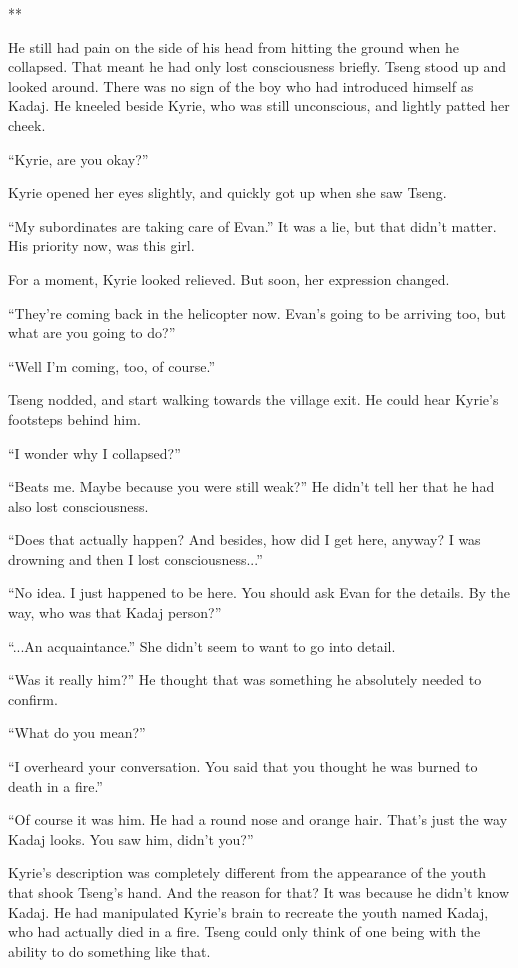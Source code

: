 \documentclass[oneside]{book}
\begin{document}
**

He still had pain on the side of his head from hitting the ground when he collapsed. That meant he had only lost consciousness briefly. Tseng stood up and looked around. There was no sign of the boy who had introduced himself as Kadaj. He kneeled beside Kyrie, who was still unconscious, and lightly patted her cheek.

“Kyrie, are you okay?”

Kyrie opened her eyes slightly, and quickly got up when she saw Tseng.

“My subordinates are taking care of Evan.” It was a lie, but that didn’t matter. His priority now, was this girl.

For a moment, Kyrie looked relieved. But soon, her expression changed.

“They’re coming back in the helicopter now. Evan’s going to be arriving too, but what are you going to do?”

“Well I’m coming, too, of course.”

Tseng nodded, and start walking towards the village exit. He could hear Kyrie’s footsteps behind him.

“I wonder why I collapsed?”

“Beats me. Maybe because you were still weak?” He didn’t tell her that he had also lost consciousness.

“Does that actually happen? And besides, how did I get here, anyway? I was drowning and then I lost consciousness...”

“No idea. I just happened to be here. You should ask Evan for the details. By the way, who was that Kadaj person?”

“...An acquaintance.” She didn’t seem to want to go into detail.

“Was it really him?” He thought that was something he absolutely needed to confirm.

“What do you mean?”

“I overheard your conversation. You said that you thought he was burned to death in a fire.”

“Of course it was him. He had a round nose and orange hair. That’s just the way Kadaj looks. You saw him, didn’t you?”

Kyrie’s description was completely different from the appearance of the youth that shook Tseng’s hand. And the reason for that? It was because he didn’t know Kadaj. He had manipulated Kyrie’s brain to recreate the youth named Kadaj, who had actually died in a fire. Tseng could only think of one being with the ability to do something like that.
\end{document}
